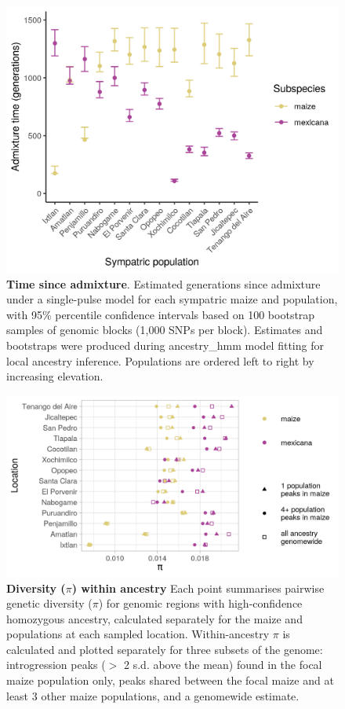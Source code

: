 \begin{figure}[ht]
\includegraphics[width=\textwidth]{chapter2/figures/admix_times_Ne10000_yesBoot.png}
\caption{\color{Gray} \textbf{Time since admixture}. Estimated generations since admixture under a single-pulse model for each sympatric maize and \mexicana population, with 95\% percentile confidence intervals based on 100 bootstrap samples of genomic blocks (1,000 SNPs per block). Estimates and bootstraps were produced during ancestry\_hmm model fitting for local ancestry inference. Populations are ordered left to right by increasing elevation.}
\label{time_admix}
\end{figure}

\begin{figure}[ht]
\includegraphics[width=\textwidth]{chapter2/figures/pi_within_mexicana_ancestry_peaks.png}
\caption{\color{Gray} \textbf{Diversity ($\pi$) within \mexicana ancestry} Each point summarises pairwise genetic diversity ($\pi$) for genomic regions with high-confidence homozygous \mexicana ancestry, calculated separately for the maize and \mexicana populations at each sampled location. Within-\mexicana ancestry $\pi$ is calculated and plotted separately for three subsets of the genome: introgression peaks ($>$ 2 s.d. above the mean) found in the focal maize population only, peaks shared between the focal maize and at least 3 other maize populations, and a genomewide estimate.}
\label{pi_mexicana_ancestry_peaks}
\end{figure}

